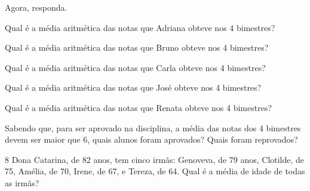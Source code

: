 Agora, responda.

\begin{escolha}
\item Qual é a média aritmética das notas que Adriana obteve nos 4
bimestres?

\item Qual é a média aritmética das notas que Bruno obteve nos 4 bimestres?

\item Qual é a média aritmética das notas que Carla obteve nos 4 bimestres?

\item Qual é a média aritmética das notas que José obteve nos 4 bimestres?

\item Qual é a média aritmética das notas que Renata obteve nos 4
bimestres?

\item Sabendo que, para ser aprovado na disciplina, a média das notas dos 4
bimestres devem ser maior que 6, quais alunos foram aprovados? Quais
foram reprovados?

\end{escolha}








\num{8} Dona Catarina, de 82 anos, tem cinco irmãs: Genoveva, de 79 anos,
Clotilde, de 75, Amélia, de 70, Irene, de 67, e Tereza, de 64. Qual é a
média de idade de todas as irmãs?








